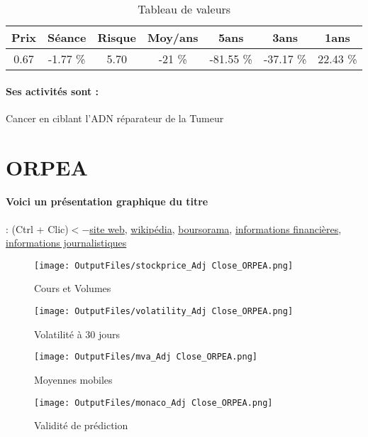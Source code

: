 \documentclass[11pt,a4paper]{report}%
\begin{document}
\begin{table}[H]
  \centering
    \begin{tabular}{|c|c|c|c|c|c|c|}
    \hline
    Prix & Séance & Risque  & Moy/ans & 5ans & 3ans & 1ans \\
    \hline
    0.67 &    -1.77 \%    & 5.70 & -21 \% & -81.55 \% & -37.17 \% & 22.43 \% \\
    \hline
    \end{tabular}%
        \label{tab:table_ONXEO}%
      \caption{Tableau de valeurs}
\end{table}%

\paragraph{Ses activités sont : } Cancer en ciblant l’ADN réparateur de la Tumeur 
    
    \newpage

\section{ORPEA}

\paragraph{Voici un présentation graphique du titre} : (Ctrl + Clic)$<-$\href{https://www.orpea-corp.com/documentation-invest-fr/presentations}{site web}, \href{https://fr.wikipedia.org/wiki/Orpea}{wikipédia}, \href{https://www.boursorama.com/cours/1rPORP}{boursorama}, \href{https://www.qwant.com/?q=site:https:%2f%2fwww.easybourse.com%2faction-societe%2fORPEA&t=web&client=ext-firefox-hp}{informations financières}, \href{https://bourse.lerevenu.com/cours-de-bourse/fiche-valeur-synthese/ORPEA/ORP-FR}{informations journalistiques}
\begin{figure}[!htb]
   \begin{minipage}{0.5\textwidth}
     \centering
     \texttt{[image: OutputFiles/stockprice\_Adj Close\_ORPEA.png]}
     \caption{Cours et Volumes}\label{Fig:price_ORPEA}
   \end{minipage}\hfill
   \begin{minipage}{0.5\textwidth}
     \centering
     \texttt{[image: OutputFiles/volatility\_Adj Close\_ORPEA.png]}
     \caption{Volatilité à 30 jours}\label{Fig:volat_ORPEA}
   \end{minipage}
\end{figure}
\begin{figure}[!htb]
   \begin{minipage}{0.5\textwidth}
     \centering
     \texttt{[image: OutputFiles/mva\_Adj Close\_ORPEA.png]}
     \caption{Moyennes mobiles}\label{Fig:mva_ORPEA}
   \end{minipage}\hfill
   \begin{minipage}{0.5\textwidth}
     \centering
     \texttt{[image: OutputFiles/monaco\_Adj Close\_ORPEA.png]}
     \caption{Validité de prédiction}\label{Fig:prediction_ORPEA}
   \end{minipage}
\end{figure}
\end{document}
